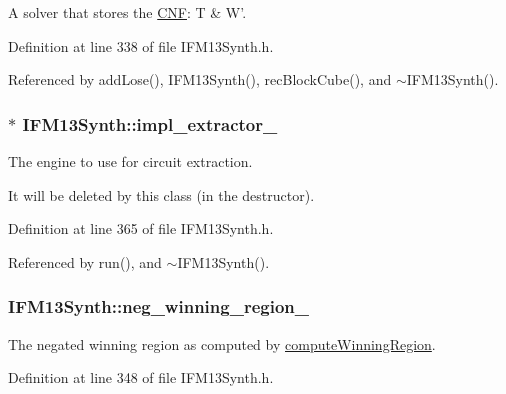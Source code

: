 A solver that stores the \hyperlink{classCNF}{C\-N\-F}\-: T \& W'. 



Definition at line 338 of file I\-F\-M13\-Synth.\-h.



Referenced by add\-Lose(), I\-F\-M13\-Synth(), rec\-Block\-Cube(), and $\sim$\-I\-F\-M13\-Synth().

\hypertarget{classIFM13Synth_a1d87a79eab422a71fdc23f70d4279cbd}{
\subsubsection[{impl\-\_\-extractor\-\_\-}]{$\ast$ I\-F\-M13\-Synth\-::impl\-\_\-extractor\-\_\-\hspace{0.3cm}{\ttfamily [protected]}}}\label{classIFM13Synth_a1d87a79eab422a71fdc23f70d4279cbd}


The engine to use for circuit extraction. 

It will be deleted by this class (in the destructor). 

Definition at line 365 of file I\-F\-M13\-Synth.\-h.



Referenced by run(), and $\sim$\-I\-F\-M13\-Synth().

\hypertarget{classIFM13Synth_a334e8e6b638c8c57da3db0c3d161231b}{
\subsubsection[{neg\-\_\-winning\-\_\-region\-\_\-}]{ I\-F\-M13\-Synth\-::neg\-\_\-winning\-\_\-region\-\_\-\hspace{0.3cm}{\ttfamily [protected]}}}\label{classIFM13Synth_a334e8e6b638c8c57da3db0c3d161231b}


The negated winning region as computed by \hyperlink{classIFM13Synth_a51c6831265e1daf7d0120c0dd954a0c4}{compute\-Winning\-Region}. 



Definition at line 348 of file I\-F\-M13\-Synth.\-h.



